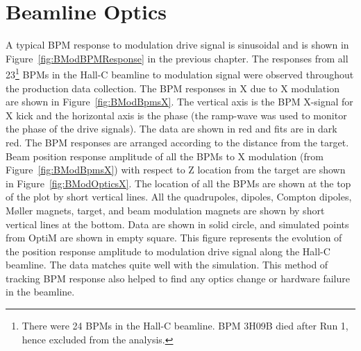 \section{Beamline Optics}
\label{Beamline Optics}
A typical BPM response to modulation drive signal is sinusoidal and is shown in Figure~\ref{fig:BModBPMResponse} in the previous chapter. The responses from all 23\footnote{There were 24 BPMs in the Hall-C beamline. BPM 3H09B died after Run 1, hence excluded from the analysis.} BPMs in the Hall-C beamline to modulation signal were observed throughout the production data collection. The BPM responses in X due to X modulation are shown in Figure~\ref{fig:BModBpmsX}. The vertical axis is the BPM X-signal for X kick and the horizontal axis is the phase (the ramp-wave was used to monitor the phase of the drive signals). The data are shown in red and fits are in dark red. The BPM responses are arranged according to the distance from the target. 
Beam position response amplitude of all the BPMs to X modulation (from Figure~\ref{fig:BModBpmsX}) with respect to Z location from the target are shown in Figure~\ref{fig:BModOpticsX}. 
The location of all the BPMs are shown at the top of the plot by short vertical lines. All the quadrupoles, dipoles, Compton dipoles, M{\o}ller magnets, target, and beam modulation magnets are shown by short vertical lines at the bottom. Data are shown in solid circle, and simulated points from OptiM are shown in empty square. This figure represents the evolution of the position response amplitude to modulation drive signal along the Hall-C beamline. The data matches quite well with the simulation. This method of tracking BPM response also helped to find any optics change or hardware failure in the beamline. 



